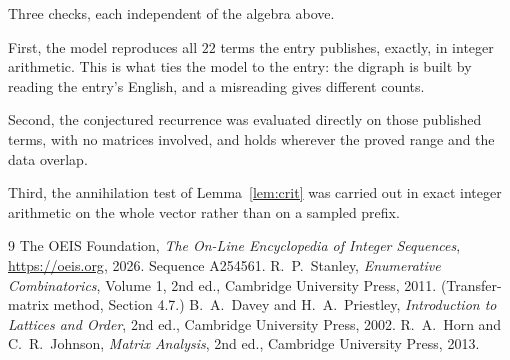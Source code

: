 \documentclass[11pt,a4paper]{article}
\theoremstyle{plain}
\theoremstyle{definition}
\begin{document}
Three checks, each independent of the algebra above.

First, the model reproduces all $22$ terms the entry publishes, exactly, in integer
arithmetic. This is what ties the model to the entry: the digraph is built by reading the
entry's English, and a misreading gives different counts.

Second, the conjectured recurrence was evaluated directly on those published terms, with no
matrices involved, and holds wherever the proved range and the data overlap.

Third, the annihilation test of Lemma~\ref{lem:crit} was carried out in exact integer
arithmetic on the whole vector rather than on a sampled prefix.

\begin{thebibliography}{9}
 The OEIS Foundation, \emph{The On-Line Encyclopedia of Integer
Sequences}, \url{https://oeis.org}, 2026. Sequence A254561.
 R.~P.~Stanley, \emph{Enumerative Combinatorics}, Volume 1, 2nd ed.,
Cambridge University Press, 2011. (Transfer-matrix method, Section 4.7.)
 B.~A.~Davey and H.~A.~Priestley, \emph{Introduction to Lattices and
Order}, 2nd ed., Cambridge University Press, 2002.
 R.~A.~Horn and C.~R.~Johnson, \emph{Matrix Analysis}, 2nd ed., Cambridge
University Press, 2013.
\end{thebibliography}
\end{document}
